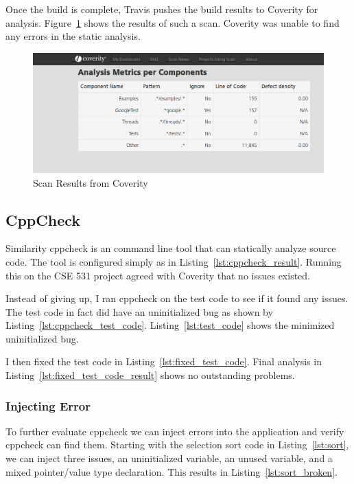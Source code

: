 \documentclass[12pt,journal]{article}
\begin{document}
Once the build is complete, Travis pushes the build results to Coverity for
analysis. Figure~\ref{fig:coverity_results} shows the results of such a scan.
Coverity was unable to find any errors in the static analysis.

\begin{figure}
    \centering
    \includegraphics[width=0.8\columnwidth]{CoverityScan.png}
    \caption{Scan Results from Coverity}
    \label{fig:coverity_results}
\end{figure}

\subsection{CppCheck}
Similarity cppcheck is an command line tool that can statically analyze source
code. The tool is configured simply as in Listing~\ref{lst:cppcheck_result}.
Running this on the CSE 531 project agreed with Coverity that no issues
existed. 


Instead of giving up, I ran cppcheck on the test code to see if it found any
issues. The test code in fact did have an uninitialized bug as shown by
Listing~\ref{lst:cppcheck_test_code}.
 Listing~\ref{lst:test_code}
shows the minimized uninitialized bug. 


I then fixed the test code in Listing~\ref{lst:fixed_test_code}. Final analysis
in Listing~\ref{lst:fixed_test_code_result} shows no outstanding problems.




\subsubsection{Injecting Error}
To further evaluate cppcheck we can inject errors into the application and
verify cppcheck can find them.  Starting with the selection sort code in
Listing~\ref{lst:sort}, we can inject three issues, an uninitialized variable,
an unused variable, and a mixed pointer/value type declaration. This results in 
Listing~\ref{lst:sort_broken}.  
\end{document}
